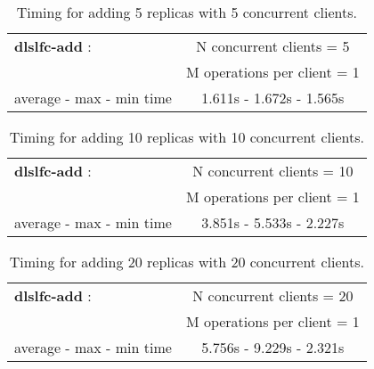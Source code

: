 \documentclass[pdftex]{cmspaper}
\begin{document}
\begin{table}[!htbp]
\begin{center}
 \begin{tabular}{|l|c|}         \hline
   {\bf dlslfc-add} :  & N concurrent clients = 5  \\ & M operations per client = 1\\ \hline
    average - max - min time     & 1.611s - 1.672s - 1.565s \\ \hline
\end{tabular}
\caption {Timing for adding 5 replicas with 5 concurrent clients.}\label{dlslfc-add}
\end{center}
\end{table}

\begin{table}[!htbp]
\begin{center}
 \begin{tabular}{|l|c|}         \hline
   {\bf dlslfc-add} : & N concurrent clients = 10  \\ & M operations per client = 1\\ \hline
    average - max - min time  & 3.851s - 5.533s - 2.227s \\ \hline
\end{tabular}
\caption {Timing for adding 10 replicas with 10 concurrent clients.}\label{dlslfc-add}
\end{center}
\end{table}

\begin{table}[!htbp]
\begin{center}
 \begin{tabular}{|l|c|}         \hline
   {\bf dlslfc-add} : & N concurrent clients = 20  \\ & M operations per client = 1\\ \hline
    average - max - min time    & 5.756s  - 9.229s - 2.321s \\ \hline
\end{tabular}
\caption {Timing for adding 20 replicas with 20 concurrent clients.}\label{dlslfc-add}
\end{center}
\end{table}
\end{document}
